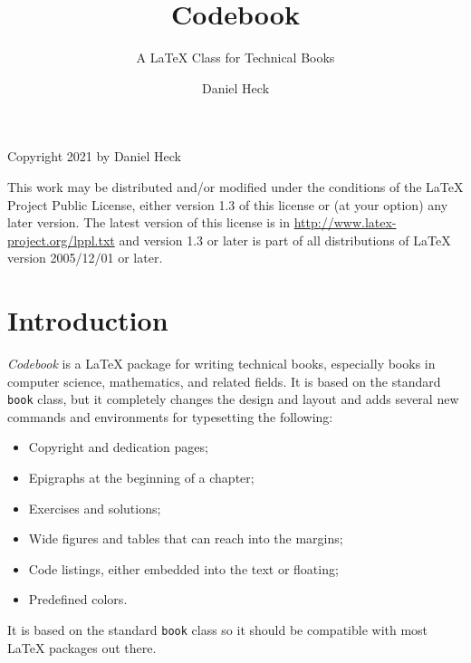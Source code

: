 \documentclass[minted]{codebook}
\begin{document}
\frontmatter

\author{Daniel Heck}
\title{Codebook}
\subtitle{A LaTeX Class for Technical Books}

\maketitle

\begin{copyrightpage}
Copyright \textcopyright{} 2021 by Daniel Heck

This work may be distributed and/or modified under the
conditions of the LaTeX Project Public License, either version 1.3
of this license or (at your option) any later version.
The latest version of this license is in
  \url{http://www.latex-project.org/lppl.txt}
and version 1.3 or later is part of all distributions of LaTeX
version 2005/12/01 or later.
\end{copyrightpage}




\tableofcontents

\chapter{Introduction}

\chapterindent
\emph{Codebook} is a \LaTeX{} package for writing technical books,
especially books in computer science, mathematics, and related fields.
It is based on the standard \texttt{book} class, but it completely changes the design and layout and adds several new commands and environments for typesetting the following:
\begin{itemize}
  \item Copyright and dedication pages;
  \item Epigraphs at the beginning of a chapter;
  \item Exercises and solutions;
  \item Wide figures and tables that can reach into the margins;
  \item Code listings, either embedded into the text or floating;
  \item Predefined colors.
\end{itemize}
It is based on the standard \texttt{book} class so it should be compatible with most \LaTeX{} packages out there.
\end{document}
